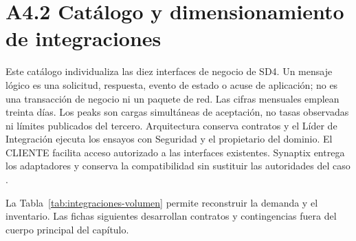 \clearpage
\chapter*{A4.2 Catálogo y dimensionamiento de integraciones}
\label{anexo:integraciones-dimensionadas}

Este catálogo individualiza las diez interfaces de negocio de SD4. Un mensaje lógico es una solicitud, respuesta, evento de estado o acuse de aplicación; no es una transacción de negocio ni un paquete de red. Las cifras mensuales emplean treinta días. Los peaks son cargas simultáneas de aceptación, no tasas observadas ni límites publicados del tercero. Arquitectura conserva contratos y el Líder de Integración ejecuta los ensayos con Seguridad y el propietario del dominio. El CLIENTE facilita acceso autorizado a las interfaces existentes. Synaptix entrega los adaptadores y conserva la compatibilidad sin sustituir las autoridades del caso \parencites[art.~19, p.~13]{pucv-admin}[cap.~14, sec.~14.2; cap.~15, RT-05.23]{caso07}.

La Tabla~\ref{tab:integraciones-volumen} permite reconstruir la demanda y el inventario. Las fichas siguientes desarrollan contratos y contingencias fuera del cuerpo principal del capítulo.

